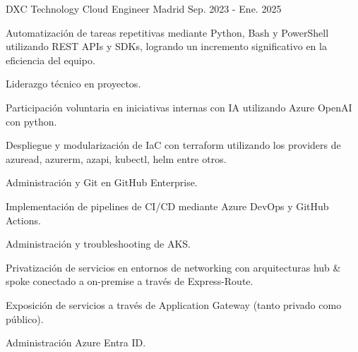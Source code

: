 \begin{cventries}
  \cventry
    {DXC Technology} %
    {Cloud Engineer} %
    {Madrid} %
    {Sep. 2023 - Ene. 2025} %
    {
      \begin{cvitems} %
        \item {Automatización de tareas repetitivas mediante Python, Bash y PowerShell utilizando REST APIs y SDKs, logrando un incremento significativo en la eficiencia del equipo.}
        \item {Liderazgo técnico en proyectos.}
        \item {Participación voluntaria en iniciativas internas con IA utilizando Azure OpenAI con python.}
        \item {Despliegue y modularización de IaC con terraform utilizando los providers de azuread, azurerm, azapi, kubectl, helm entre otros.}
        \item {Administración y Git en GitHub Enterprise.}
        \item {Implementación de pipelines de CI/CD mediante Azure DevOps y GitHub Actions.}
        \item {Administración y troubleshooting de AKS.}
        \item {Privatización de servicios en entornos de networking con arquitecturas hub \& spoke conectado a on-premise a través de Express-Route.}
        \item {Exposición de servicios a través de Application Gateway (tanto privado como público).}
        \item {Administración Azure Entra ID.}
      \end{cvitems}
    }



\end{cventries}
